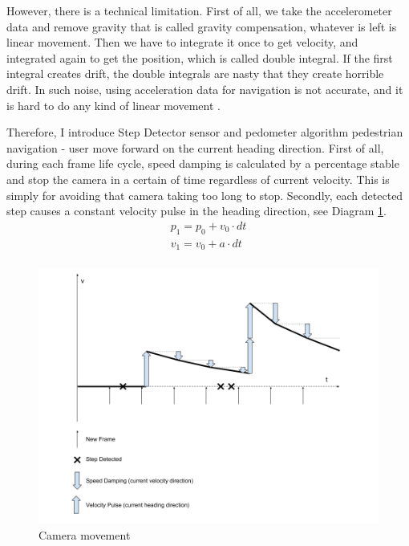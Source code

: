 However, there is a technical limitation. First of all, we take the accelerometer data and remove gravity that is called gravity compensation, whatever is left is linear movement. Then we have to integrate it once to get velocity, and integrated again to get the position, which is called double integral. If the first integral creates drift, the double integrals are nasty that they create horrible drift. In such noise, using acceleration data for navigation is not accurate, and it is hard to do any kind of linear movement \cite{google.sensor-fusion.2010}.

Therefore, I introduce Step Detector sensor and pedometer algorithm pedestrian navigation - user move forward on the current heading direction. First of all, during each frame life cycle, speed damping is calculated by a percentage stable and stop the camera in a certain of time regardless of current velocity. This is simply for avoiding that camera taking too long to stop. Secondly, each detected step causes a constant velocity pulse in the heading direction, see Diagram \ref{fig:camera-movement}.
\[
\begin{array}{lr}
p_1 = p_0 + v_0 \cdot dt\\
v_1 = v_0 + a \cdot dt\\
\end{array}
\]

\begin{figure}[H]
\caption{Camera movement}
\label{fig:camera-movement}
\centering
\includegraphics[width=\textwidth, keepaspectratio]{Figures/camera-movement.png}
\decoRule
\end{figure}

